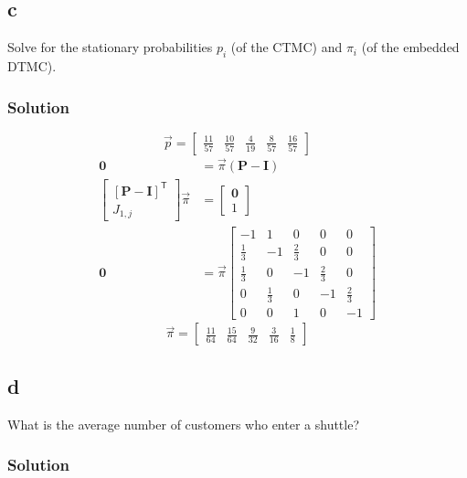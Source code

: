 \documentclass[letterpaper]{amsart}
\begin{document}
\subsection*{c}
Solve for the stationary probabilities $p_i$ (of the CTMC) and $\pi_i$ (of the
embedded DTMC).
\subsubsection*{Solution}
\begin{equation}
  \vec{p} =
\begin{bmatrix}
  \frac{11}{57} &
  \frac{10}{57} &
  \frac{4}{19} &
  \frac{8}{57} &
  \frac{16}{57}
\end{bmatrix}
\end{equation}
\begin{align}
  \mathbf{0} &=\vec{\pi}(\mathbf{P}-\mathbf{I}) \\
\begin{bmatrix}
  \left[\mathbf{P}-\mathbf{I}\right]^\mathsf{T} \\
  J_{1,j}
\end{bmatrix}
  \vec{\pi} &=
              \begin{bmatrix}
                \mathbf{0} \\
                1
              \end{bmatrix}
  \\
  \mathbf{0} &=\vec{\pi}
\begin{bmatrix}
  -1 & 1 & 0 & 0 & 0 \\
  \frac{1}{3} & -1 & \frac{2}{3} & 0 & 0 \\
  \frac{1}{3} & 0 & -1 & \frac{2}{3} & 0 \\
  0 & \frac{1}{3} & 0 & -1 & \frac{2}{3} \\
  0 & 0 & 1 & 0 & -1
\end{bmatrix}
\end{align}
\begin{equation}
  \vec{\pi} =
\begin{bmatrix}
  \frac{11}{64} &
  \frac{15}{64} &
  \frac{9}{32} &
  \frac{3}{16} &
  \frac{1}{8}
\end{bmatrix}
\end{equation}
\subsection*{d}
What is the average number of customers who enter a shuttle?
\subsubsection*{Solution}
\end{document}
